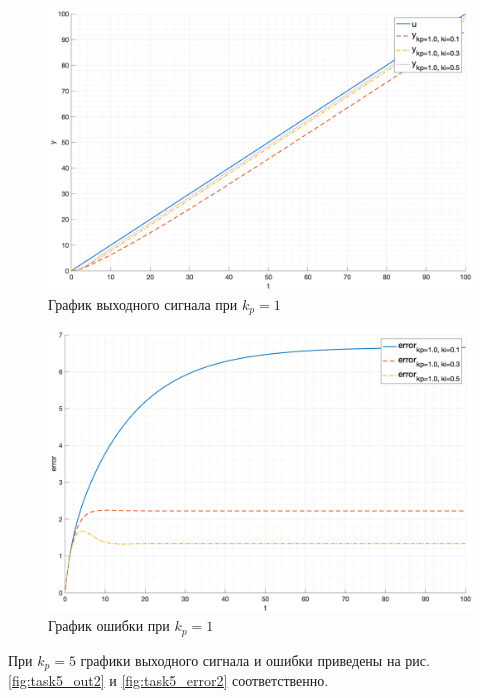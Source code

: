 \begin{figure}[ht!]
    \centering
    \includegraphics[width=\textwidth]{media/plots/task5_out_kp_1.0_1.png}
    \caption{График выходного сигнала при $k_p = 1$}
    \label{fig:task5_out1}
\end{figure}

\begin{figure}[ht!]
    \centering
    \includegraphics[width=\textwidth]{media/plots/task5_error_kp_1.0_1.png}
    \caption{График ошибки при $k_p = 1$}
    \label{fig:task5_error1}
\end{figure}

При $k_p = 5$ графики выходного сигнала и ошибки приведены
на рис. \ref{fig:task5_out2} и \ref{fig:task5_error2} соответственно.

